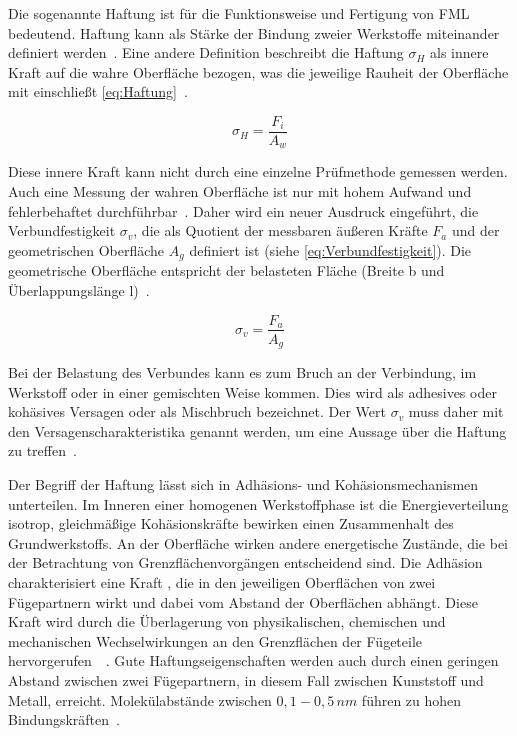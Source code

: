 Die sogenannte Haftung ist für die Funktionsweise und Fertigung von FML bedeutend.
Haftung kann als Stärke der Bindung zweier Werkstoffe miteinander definiert werden~\cite{Mann1994}.
Eine andere Definition beschreibt die Haftung $\sigma_H$ als innere Kraft  auf die wahre Oberfläche  bezogen, was die jeweilige Rauheit der Oberfläche mit einschließt \autoref{eq:Haftung}~\cite{Bischof1993}.

\begin{equation}
    \sigma_H = \frac{F_i}{A_w}
    \label{eq:Haftung}
\end{equation}

Diese innere Kraft kann nicht durch eine einzelne Prüfmethode gemessen werden.
Auch eine Messung der wahren Oberfläche ist nur mit hohem Aufwand und fehlerbehaftet durchführbar~\cite{Brockmann1969}.
Daher wird ein neuer Ausdruck eingeführt, die Verbundfestigkeit $\sigma_v$, die als Quotient der messbaren äußeren Kräfte $F_a$ und der geometrischen Oberfläche $A_g$ definiert ist (siehe \autoref{eq:Verbundfestigkeit}).
Die geometrische Oberfläche entspricht der belasteten Fläche (Breite b und Überlappungslänge l)~\cite{Habenicht2009}.

\begin{equation}
    \sigma_v = \frac{F_a}{A_g}
    \label{eq:Verbundfestigkeit}
\end{equation}

Bei der Belastung des Verbundes kann es zum Bruch an der Verbindung, im Werkstoff oder in einer gemischten Weise kommen.
Dies wird als adhesives oder kohäsives Versagen oder als Mischbruch bezeichnet.
Der Wert $\sigma_v$ muss daher mit den Versagenscharakteristika genannt werden, um eine Aussage über die Haftung zu treffen~\cite{Pan2016}.

Der Begriff der Haftung lässt sich in Adhäsions- und Kohäsionsmechanismen unterteilen.
Im Inneren einer homogenen Werkstoffphase ist die Energieverteilung isotrop, gleichmäßige Kohäsionskräfte bewirken einen Zusammenhalt des Grundwerkstoffs.
An der Oberfläche wirken andere energetische Zustände, die bei der Betrachtung von Grenzflächenvorgängen entscheidend sind.
Die Adhäsion charakterisiert eine Kraft , die in den jeweiligen Oberflächen von zwei Fügepartnern wirkt und dabei vom Abstand der Oberflächen abhängt.
Diese Kraft wird durch die Überlagerung von physikalischen, chemischen und mechanischen Wechselwirkungen an den Grenzflächen der Fügeteile hervorgerufen~\cite{Habenicht2009}~.
Gute Haftungseigenschaften werden auch durch einen geringen Abstand zwischen zwei Fügepartnern, in diesem Fall zwischen Kunststoff und Metall, erreicht.
Molekülabstände zwischen $0,1 - 0,5\, nm$ führen zu hohen Bindungskräften~\cite{Suchentrunk2007}.

